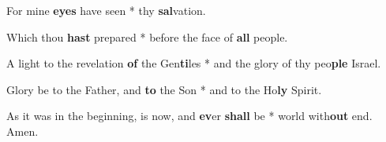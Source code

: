 \begin{multicols}{2}
	For mine \textbf{eyes} have seen * thy \textbf{sal}vation.
	
	Which thou \textbf{hast} prepared * before the face of \textbf{all} people.
	
	A light to the revelation \textbf{of} the Gen\textbf{ti}les * and the glory of thy peo\textbf{ple} Israel.
	
	Glory be to the Father, and \textbf{to} the Son * and to the Ho\textbf{ly} Spirit.
	
	As it was in the beginning, is now, and \textbf{ev}er \textbf{shall} be * world with\textbf{out} end. Amen.
\end{multicols}